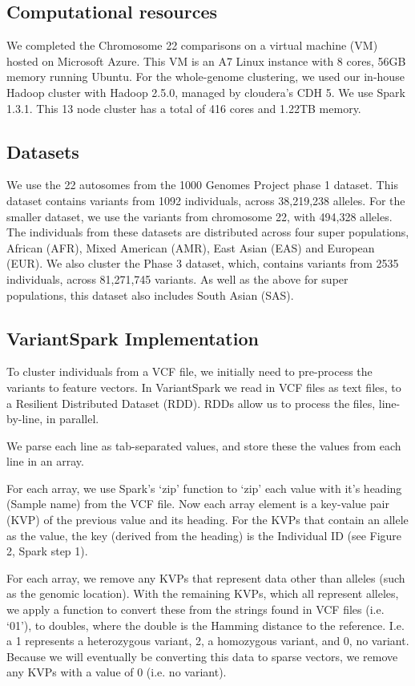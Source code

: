 \documentclass{bmcart}
\newcommand{\variantSpark}{{\sc VariantSpark}}
\begin{document}
\subsection*{Computational resources}
We completed the Chromosome 22 comparisons on a virtual machine (VM) hosted on Microsoft Azure. This VM is an A7 Linux instance with 8 cores, 56GB
memory running Ubuntu. 
For the whole-genome clustering, we used our in-house Hadoop cluster with Hadoop 2.5.0, managed by cloudera's CDH 5. We use Spark 1.3.1. This 13 node
cluster has a total of 416 cores and 1.22TB memory.


\subsection*{Datasets}
We use the 22 autosomes from the 1000 Genomes Project phase 1 dataset. This dataset contains variants from 1092 individuals, across 38,219,238 alleles.
For the smaller dataset, we use the variants from chromosome 22, with 494,328 alleles.
The individuals from these datasets are distributed across four super populations, African (AFR), Mixed American (AMR), East Asian (EAS) and European (EUR).
We also cluster the Phase 3 dataset, which, contains variants from 2535 individuals, across 81,271,745 variants. As well as the above for super populations, this
dataset also includes South Asian (SAS).



\subsection*{VariantSpark Implementation}
To cluster individuals from a VCF file, we initially need to pre-process the variants to feature vectors.
In \variantSpark{} we read in VCF files as text files, to a Resilient Distributed Dataset (RDD). RDDs allow us to process the files, line-by-line, in parallel.

We parse each line as tab-separated values, and store these the values from each line in an array.

For each array, we use Spark's `zip' function to `zip' each value with it's heading (Sample name) from the VCF file. Now each array element is a
key-value pair (KVP) of the previous value and its heading. For the KVPs that contain an allele as the value, the key (derived from the heading) is
the Individual ID (see Figure 2, Spark step 1).

For each array, we remove any KVPs that represent data other than alleles (such as the genomic location). With the remaining KVPs, which all
represent alleles, we apply a function to convert these from the strings found in VCF files (i.e. `0\textbar{}1'), to doubles, where the double is the
Hamming distance to the reference. I.e. a 1 represents a heterozygous variant, 2, a homozygous variant, and 0, no variant. Because we will
eventually be converting this data to sparse vectors, we remove any KVPs with a value of 0 (i.e. no variant).
\end{document}
